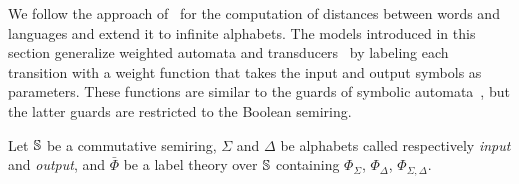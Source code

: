We follow the approach of~\cite{Mohri03EDWA} for the computation of distances
between words and languages
and extend it to infinite alphabets.
%
The models introduced in this section generalize
weighted automata and transducers~\cite{Droste09handbook}
by labeling each transition with a weight function
that takes the input and output symbols as parameters.
These functions are similar to the guards of symbolic automata~\cite{dAntoniVeanes17CAV,dAntoni21CACM},
but the latter guards are restricted to the Boolean semiring.
%

\noindent
Let $\mathbb{S}$ be a commutative semiring,
$\Sigma$ and $\Delta$ be alphabets called respectively \emph{input} and \emph{output}, %
and $\bar\Phi$ be a label theory over $\mathbb{S}$
containing $\Phi_\Sigma$, $\Phi_\Delta$, $\Phi_{\Sigma, \Delta}$.

